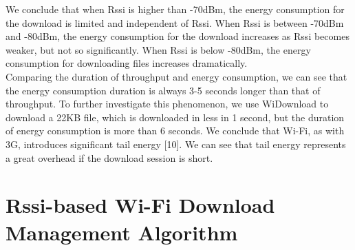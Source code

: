 \documentclass[journal]{IEEEtran}
\begin{document}
\indent 
We conclude that when Rssi is higher than -70dBm, 
the energy consumption for the download is limited and independent of Rssi.
When Rssi is between -70dBm and -80dBm, the energy consumption for the download increases as Rssi becomes weaker, but not so significantly.  
When Rssi is below -80dBm, the energy consumption for downloading files increases dramatically. 
\\
\indent 
Comparing the duration of throughput and energy consumption, we can see that the energy consumption duration is always 3-5 seconds longer than that of 
throughput. To further investigate this phenomenon, we use WiDownload to download a 22KB file, which is downloaded in less in 1 second, but the duration of 
energy consumption is more than 6 seconds. We conclude that Wi-Fi, as with 3G, introduces
significant tail energy [10]. We can see that tail energy represents a great overhead if the download session is short.
\section{Rssi-based Wi-Fi Download Management Algorithm}
\end{document}
